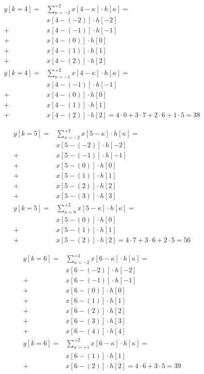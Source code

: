 \begin{align}
y[k=4] =& \sum\limits_{\kappa = -2}^{+2} x[4 -\kappa] \cdot h[\kappa] =\\
&x[4 -(-2)] \cdot h[-2]\nonumber\\
+&x[4 -(-1)] \cdot h[-1]\nonumber\\
+&x[4 -(0)] \cdot h[0]\nonumber\\
+&x[4 -(1)] \cdot h[1]\nonumber\\
+&x[4 -(2)] \cdot h[2]\nonumber\\
y[k=4] = & \sum\limits_{\kappa = -1}^{+2} x[4 -\kappa] \cdot h[\kappa] =\nonumber\\
&x[4 -(-1)] \cdot h[-1]\nonumber\\
+&x[4 -(0)] \cdot h[0]\nonumber\\
+&x[4 -(1)] \cdot h[1]\nonumber\\
+&x[4 -(2)] \cdot h[2] = 4\cdot 0 + 3\cdot 7 + 2\cdot 6 + 1\cdot 5 = 38\nonumber
\end{align}

\clearpage
\begin{align}
y[k=5] = & \sum\limits_{\kappa = -2}^{+3} x[5 -\kappa] \cdot h[\kappa] =\\
&x[5 -(-2)] \cdot h[-2]\nonumber\\
+&x[5 -(-1)] \cdot h[-1]\nonumber\\
+&x[5 -(0)] \cdot h[0]\nonumber\\
+&x[5 -(1)] \cdot h[1]\nonumber\\
+&x[5 -(2)] \cdot h[2]\nonumber\\
+&x[5 -(3)] \cdot h[3]\nonumber\\
y[k=5] = & \sum\limits_{\kappa = 0}^{+2} x[5 -\kappa] \cdot h[\kappa] =\nonumber\\
&x[5 -(0)] \cdot h[0]\nonumber\\
+&x[5 -(1)] \cdot h[1]\nonumber\\
+&x[5 -(2)] \cdot h[2] = 4\cdot 7 + 3\cdot 6 + 2\cdot 5 = 56\nonumber
\end{align}

\begin{align}
y[k=6] =& \sum\limits_{\kappa = -2}^{+4} x[6 -\kappa] \cdot h[\kappa] =\\
&x[6 -(-2)] \cdot h[-2]\nonumber\\
+&x[6 -(-1)] \cdot h[-1]\nonumber\\
+&x[6 -(0)] \cdot h[0]\nonumber\\
+&x[6 -(1)] \cdot h[1]\nonumber\\
+&x[6 -(2)] \cdot h[2]\nonumber\\
+&x[6 -(3)] \cdot h[3]\nonumber\\
+&x[6 -(4)] \cdot h[4]\nonumber\\
y[k=6] =& \sum\limits_{\kappa = +1}^{+2} x[6 -\kappa] \cdot h[\kappa] =\nonumber\\
&x[6 -(1)] \cdot h[1]\nonumber\\
+&x[6 -(2)] \cdot h[2] = 4\cdot 6 + 3\cdot 5 = 39\nonumber
\end{align}

